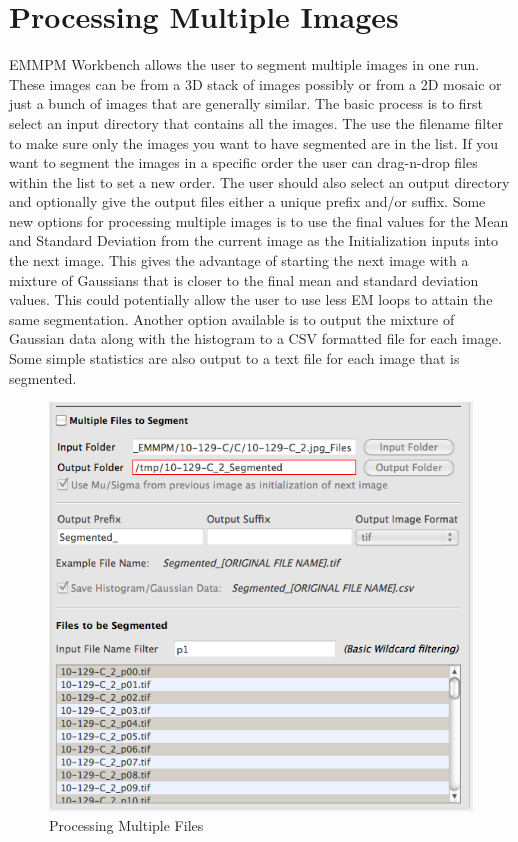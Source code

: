 \documentclass[12pt,oneside]{book}
\begin{document}
\chapter{Processing Multiple Images}
EMMPM Workbench allows the user to segment multiple images in one run. These images can be from a 3D stack of images possibly or from a 2D mosaic or just a bunch of images that are generally similar. The basic process is to first select an input directory that contains all the images. The use the filename filter to make sure only the images you want to have segmented are in the list. If you want to segment the images in a specific order the user can drag-n-drop files within the list to set a new order. The user should also select an output directory and optionally give the output files either a unique prefix and/or suffix. Some new options for processing multiple images is to use the final values for the Mean and Standard Deviation from the current image as the Initialization inputs into the next image. This gives the advantage of starting the next image with a mixture of Gaussians that is closer to the final mean and standard deviation values. This could potentially allow the user to use less EM loops to attain the same segmentation. Another option available is to output the mixture of Gaussian data along with the histogram to a CSV formatted file for each image. Some simple statistics are also output to a text file for each image that is segmented.
\begin{figure}[htbp]
\begin{center}
\includegraphics[width=6.4in]{images/Untitled15.png}
\caption{Processing Multiple Files}
\label{Untitled15}
\end{center}
\end{figure}
\end{document}
